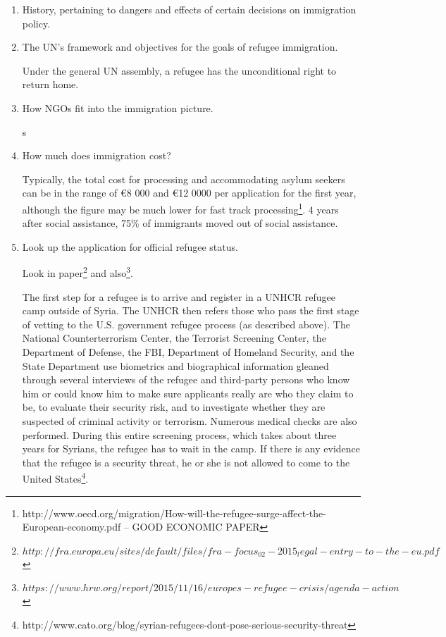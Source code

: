 \begin{enumerate}
    \item History, pertaining to dangers and effects of certain decisions on immigration policy.
    \item The UN's framework and objectives for the goals of refugee immigration.

    Under the general UN assembly, a refugee has the unconditional right to return home.

    \item How NGOs fit into the immigration picture.

    s

    \item How much does immigration cost?

    Typically, the total cost for processing and accommodating asylum seekers can be in the range of €8 000 and €12 0000 per application for the first year, although the figure may be much lower for fast track processing\footnote{http://www.oecd.org/migration/How-will-the-refugee-surge-affect-the-European-economy.pdf -- GOOD ECONOMIC PAPER}. 4 years after social assistance, 75\% of immigrants moved out of social assistance.

    \item Look up the application for official refugee status.

    Look in paper\footnote{$http://fra.europa.eu/sites/default/files/fra-focus_02-2015_legal-entry-to-the-eu.pdf$} and also\footnote{$https://www.hrw.org/report/2015/11/16/europes-refugee-crisis/agenda-action$}.

    The first step for a refugee is to arrive and register in a UNHCR refugee camp outside of Syria. The UNHCR then refers those who pass the first stage of vetting to the U.S. government refugee process (as described above). The National Counterterrorism Center, the Terrorist Screening Center, the Department of Defense, the FBI, Department of Homeland Security, and the State Department use biometrics and biographical information gleaned through several interviews of the refugee and third-party persons who know him or could know him to make sure applicants really are who they claim to be, to evaluate their security risk, and to investigate whether they are suspected of criminal activity or terrorism.  Numerous medical checks are also performed.  During this entire screening process, which takes about three years for Syrians, the refugee has to wait in the camp. If there is any evidence that the refugee is a security threat, he or she is not allowed to come to the United States\footnote{http://www.cato.org/blog/syrian-refugees-dont-pose-serious-security-threat}.


\end{enumerate}
